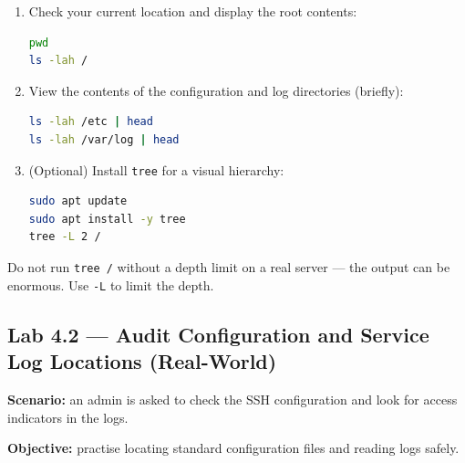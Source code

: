 \begin{enumerate}
    \item Check your current location and display the root contents:
\begin{lstlisting}[language=bash, caption={Viewing the root filesystem and its contents}]
pwd
ls -lah /
\end{lstlisting}

    \item View the contents of the configuration and log directories (briefly):
\begin{lstlisting}[language=bash, caption={Inspecting /etc and /var/log}]
ls -lah /etc | head
ls -lah /var/log | head
\end{lstlisting}

    \item (Optional) Install \texttt{tree} for a visual hierarchy:
\begin{lstlisting}[language=bash, caption={Installing tree and displaying the folder structure}]
sudo apt update
sudo apt install -y tree
tree -L 2 /
\end{lstlisting}
\end{enumerate}

\begin{warningbox}
Do not run \texttt{tree /} without a depth limit on a real server --- the
output can be enormous. Use \texttt{-L} to limit the depth.
\end{warningbox}

\subsection*{Lab 4.2 --- Audit Configuration and Service Log Locations (Real-World)}
\textbf{Scenario:} an admin is asked to check the SSH configuration and look
for access indicators in the logs.

\textbf{Objective:} practise locating standard configuration files and reading
logs safely.

